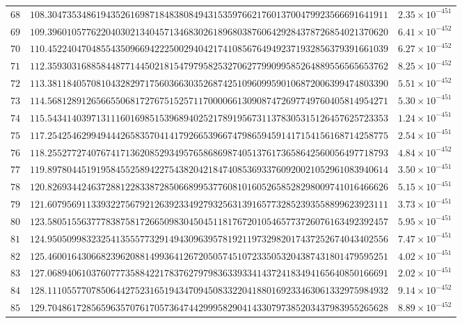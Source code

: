 \documentclass[12pt,reqno]{amsart}
\theoremstyle{remark}
\begin{document}
\begin{longtable}{clc}
$68$ & $108.3047353486194352616987184838084943153597662176013700479923566691641911$ & $2.35\times 10^{-451}$ \\
$69$ & $109.3960105776220403021340457134683026189680387606429284378726854021370620$ & $6.41\times 10^{-452}$ \\
$70$ & $110.4522404704855435096694222500294042174108567649492371932856379391661039$ & $6.27\times 10^{-452}$ \\
$71$ & $112.3593031688584487714450218154797958253270627799099585264889556565653762$ & $8.25\times 10^{-452}$ \\
$72$ & $113.3811840570810432829717560366303526874251096099590106872006399474803390$ & $5.51\times 10^{-452}$ \\
$73$ & $114.5681289126566550681727675152571170000661309087472697749760405814954271$ & $5.30\times 10^{-451}$ \\
$74$ & $115.5434140397131116016985153968940252178919567311378305315126457625723353$ & $1.24\times 10^{-451}$ \\
$75$ & $117.2542546299494442658357041417926653966747986594591417154156168714258775$ & $2.54\times 10^{-451}$ \\
$76$ & $118.2552772740767417136208529349576586869874051376173658642560056497718793$ & $4.84\times 10^{-452}$ \\
$77$ & $119.8978044519195845525894227543820421847408536933760920021052961083940614$ & $3.50\times 10^{-451}$ \\
$78$ & $120.8269344246372881228338728506689953776081016052658528298009741016466626$ & $5.15\times 10^{-451}$ \\
$79$ & $121.6079569113393227567921263923349279325631391657732852393558899623923111$ & $3.73\times 10^{-451}$ \\
$80$ & $123.5805155637778387581726650983045045118176720105465773726076163492392457$ & $5.95\times 10^{-451}$ \\
$81$ & $124.9505099832325413555773291494309639578192119732982017437252674043402556$ & $7.47\times 10^{-451}$ \\
$82$ & $125.4600164306682396208814993641267205057451072335053204387431801479595251$ & $4.02\times 10^{-451}$ \\
$83$ & $127.0689406103760777358842217837627979836339334143724183494165640850166691$ & $2.02\times 10^{-451}$ \\
$84$ & $128.1110557707850644275231651943470945083322041880169233463061332975984932$ & $9.14\times 10^{-452}$ \\
$85$ & $129.7048617285659635707617057364744299958290414330797385203437983955265628$ & $8.89\times 10^{-452}$ \\

\end{longtable}
\end{document}
